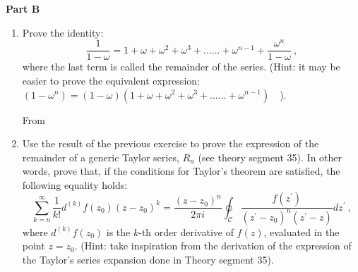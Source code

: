 \documentclass[fleqn]{article}
\begin{document}
  \textbf{Part B}
  \begin{enumerate}
    \item Prove the identity:
    $$\frac{1}{1-\omega} = 1 + \omega +\omega^2 + \omega^3 + ...... + \omega^{n-1}  + \frac{\omega^n}{1- \omega}~,$$
    where the last term is called the remainder of the series. (Hint: it may be easier to prove the equivalent expression: $(1- \omega^n) =(1- \omega)( 1 + \omega +\omega^2 + \omega^3 + ...... + \omega^{n-1} )$~~).

      \textcolor{hwColor}{
        From 
      }

    \item  Use the result of the previous exercise to prove the expression of the remainder of a generic Taylor series, $R_n$ (see theory segment 35).  In other words, prove that, if the conditions for Taylor's theorem are satisfied, the following equality holds: 
    $$\sum^{\infty}_{k=n} \frac{1}{k!} d^{(k)} f(z_0) (z-z_0)^k = \frac{(z-z_0)^n}{2 \pi i} \oint_{\mathcal C}  \frac{f(z^\prime)}{(z^\prime - z_0)^n(z^\prime - z)} dz^\prime ~,$$
    where $d^{(k)} f(z_0)$ is the $k$-th order derivative of $f(z)$, evaluated in the point $z=z_0$.   (Hint: take inspiration from the derivation of the expression of the Taylor's series expansion done in Theory segment 35). 
    

\end{enumerate}
\end{document}
